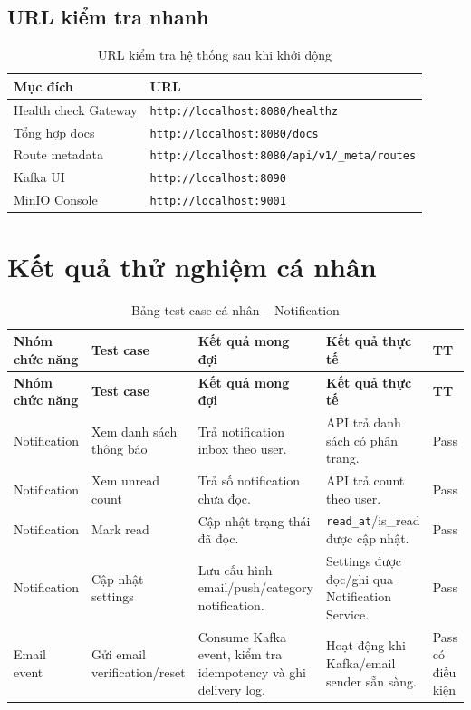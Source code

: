 \documentclass[14pt,a4paper,oneside]{extreport}
\begin{document}
\subsection{URL kiểm tra nhanh}

\begin{table}[H]
\centering
\caption{URL kiểm tra hệ thống sau khi khởi động}
\label{tab:url-kiem-tra}
\renewcommand{\arraystretch}{1.3}
\small
\begin{tabularx}{\textwidth}{|l|X|}
\hline
\textbf{Mục đích} & \textbf{URL} \\
\hline
Health check Gateway & \texttt{http://localhost:8080/healthz} \\
\hline
Tổng hợp docs & \texttt{http://localhost:8080/docs} \\
\hline
Route metadata & \texttt{http://localhost:8080/api/v1/\_meta/routes} \\
\hline
Kafka UI & \texttt{http://localhost:8090} \\
\hline
MinIO Console & \texttt{http://localhost:9001} \\
\hline
\end{tabularx}
\end{table}

\section{Kết quả thử nghiệm cá nhân}
\label{sec:ket-qua-thu-nghiem}

\begin{longtable}{|p{2.8cm}|p{4.0cm}|p{4.3cm}|p{3.0cm}|p{1.6cm}|}
\caption{Bảng test case cá nhân -- Notification}
\label{tab:test-case}\\
\hline
\textbf{Nhóm chức năng} & \textbf{Test case} & \textbf{Kết quả mong đợi} & \textbf{Kết quả thực tế} & \textbf{TT} \\
\hline
\endfirsthead
\hline
\textbf{Nhóm chức năng} & \textbf{Test case} & \textbf{Kết quả mong đợi} & \textbf{Kết quả thực tế} & \textbf{TT} \\
\hline
\endhead
Notification & Xem danh sách thông báo & Trả notification inbox theo user. & API trả danh sách có phân trang. & Pass \\
\hline
Notification & Xem unread count & Trả số notification chưa đọc. & API trả count theo user. & Pass \\
\hline
Notification & Mark read & Cập nhật trạng thái đã đọc. & \texttt{read\_at}/is\_read được cập nhật. & Pass \\
\hline
Notification & Cập nhật settings & Lưu cấu hình email/push/category notification. & Settings được đọc/ghi qua Notification Service. & Pass \\
\hline
Email event & Gửi email verification/reset & Consume Kafka event, kiểm tra idempotency và ghi delivery log. & Hoạt động khi Kafka/email sender sẵn sàng. & Pass có điều kiện \\
\hline
\end{longtable}
\end{document}

